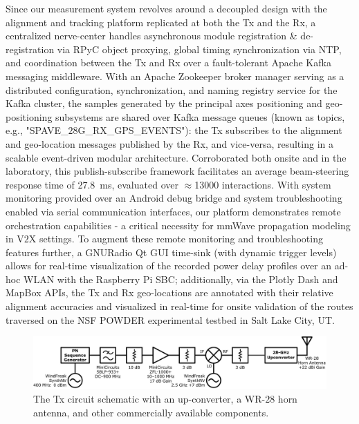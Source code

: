 \documentclass[10pt, twocolumn]{IEEEtran}
\begin{document}
Since our measurement system revolves around a decoupled design with the alignment and tracking platform replicated at both the Tx and the Rx, a centralized nerve-center handles asynchronous module registration \& de-registration via RPyC object proxying, global timing synchronization via NTP, and coordination between the Tx and Rx over a fault-tolerant Apache Kafka messaging middleware. With an Apache Zookeeper broker manager serving as a distributed configuration, synchronization, and naming registry service for the Kafka cluster, the samples generated by the principal axes positioning and geo-positioning subsystems are shared over Kafka message queues (known as topics, e.g., "SPAVE\_$28$G\_RX\_GPS\_EVENTS"): the Tx subscribes to the alignment and geo-location messages published by the Rx, and vice-versa, resulting in a scalable event-driven modular architecture. Corroborated both onsite and in the laboratory, this publish-subscribe framework facilitates an average beam-steering response time of \SI{27.8}{\milli\second}, evaluated over ${\approx}$\SI{13000}{} interactions. With system monitoring provided over an Android debug bridge and system troubleshooting enabled via serial communication interfaces, our platform demonstrates remote orchestration capabilities - a critical necessity for mmWave propagation modeling in V$2$X settings. To augment these remote monitoring and troubleshooting features further, a GNURadio Qt GUI time-sink (with dynamic trigger levels) allows for real-time visualization of the recorded power delay profiles over an ad-hoc WLAN with the Raspberry Pi SBC; additionally, via the Plotly Dash and MapBox APIs, the Tx and Rx geo-locations are annotated with their relative alignment accuracies and visualized in real-time for onsite validation of the routes traversed on the NSF POWDER experimental testbed in Salt Lake City, UT.
\begin{figure} [t]
    \centering
    \includegraphics[width=1.0\linewidth]{figs/tx_schematic.pdf}
    \vspace{-6mm}
    \caption{The Tx circuit schematic with an up-converter, a WR-$28$ horn antenna, and other commercially available components.}
    \label{F2a}
    \vspace{-6mm}
\end{figure}
\end{document}
